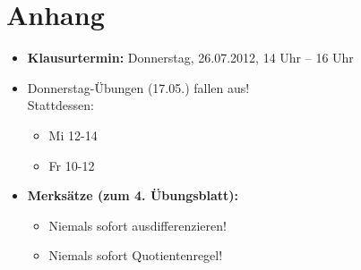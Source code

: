 \chapter*{Anhang}
\begin{itemize}
 \item \textbf{Klausurtermin:} Donnerstag, 26.07.2012, 14 Uhr – 16 Uhr
 \item Donnerstag-Übungen (17.05.) fallen aus!\\
   Stattdessen:
 \begin{itemize}
   \item Mi 12-14
   \item Fr 10-12
 \end{itemize}
 \item \textbf{Merksätze (zum 4. Übungsblatt):}
 \begin{itemize}
  \item Niemals sofort ausdifferenzieren!
  \item Niemals sofort Quotientenregel!
 \end{itemize}
\end{itemize}
